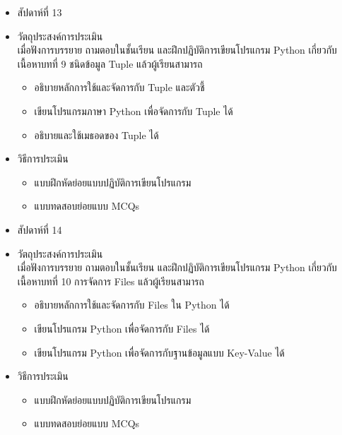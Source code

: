 \begin{tcolorbox}[breakable,enhanced,fonttitle=\bfseries]
\begin{itemize}
\item สัปดาห์ที่ 13
\item วัตถุประสงค์การประเมิน
	\\ เมื่อฟังการบรรยาย ถามตอบในชั้นเรียน และฝึกปฏิบัติการเขียนโปรแกรม Python เกี่ยวกับเนื้อหาบทที่ 9 ชนิดข้อมูล Tuple แล้วผู้เรียนสามารถ
	\begin{itemize}
	\item อธิบายหลักการใช้และจัดการกับ Tuple และตัวชี้
	\item เขียนโปรแกรมภาษา Python เพื่อจัดการกับ Tuple ได้
	\item อธิบายและใช้เมธอดของ Tuple ได้
	\end{itemize}
\item วิธีการประเมิน
	\begin{itemize}
	\item แบบฝึกหัดย่อยแบบปฏิบัติการเขียนโปรแกรม
	\item แบบทดสอบย่อยแบบ MCQs
	\end{itemize}
\end{itemize}
\end{tcolorbox}
\vspace{1.5cm}

\begin{tcolorbox}[breakable,enhanced,fonttitle=\bfseries]
\begin{itemize}
\item สัปดาห์ที่ 14
\item วัตถุประสงค์การประเมิน
	\\ เมื่อฟังการบรรยาย ถามตอบในชั้นเรียน และฝึกปฏิบัติการเขียนโปรแกรม Python เกี่ยวกับเนื้อหาบทที่ 10 การจัดการ Files แล้วผู้เรียนสามารถ
	\begin{itemize}
	\item อธิบายหลักการใช้และจัดการกับ Files ใน Python ได้
	\item เขียนโปรแกรม Python เพื่อจัดการกับ Files ได้
	\item เขียนโปรแกรม Python เพื่อจัดการกับฐานข้อมูลแบบ Key-Value ได้
	\end{itemize}
\item วิธีการประเมิน
	\begin{itemize}
	\item แบบฝึกหัดย่อยแบบปฏิบัติการเขียนโปรแกรม
	\item แบบทดสอบย่อยแบบ MCQs
	\end{itemize}
\end{itemize}
\end{tcolorbox}
\vspace{1.5cm}

